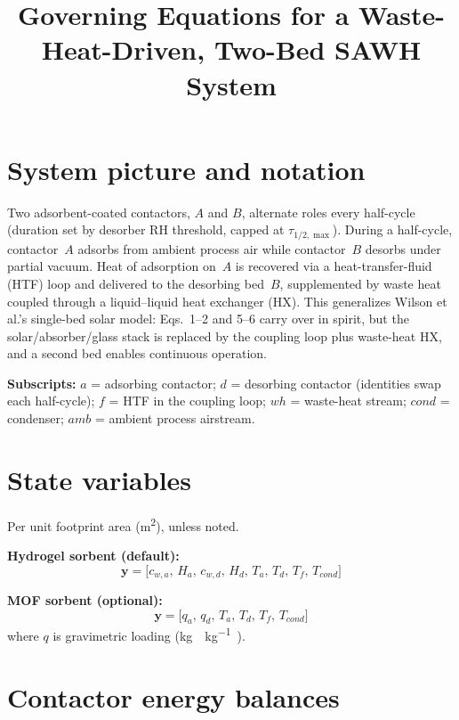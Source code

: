 \documentclass[11pt]{article}
\title{Governing Equations for a Waste-Heat-Driven, Two-Bed SAWH System}
\author{}
\date{}
\begin{document}
\maketitle

\section*{System picture and notation}

Two adsorbent-coated contactors, $A$ and $B$, alternate roles every half-cycle (duration set by desorber RH threshold, capped at $\tau_{1/2,\max}$). During a half-cycle, contactor~$A$ adsorbs from ambient process air while contactor~$B$ desorbs under partial vacuum. Heat of adsorption on~$A$ is recovered via a heat-transfer-fluid (HTF) loop and delivered to the desorbing bed~$B$, supplemented by waste heat coupled through a liquid--liquid heat exchanger (HX). This generalizes Wilson et al.'s single-bed solar model: Eqs.~1--2 and 5--6 carry over in spirit, but the solar/absorber/glass stack is replaced by the coupling loop plus waste-heat HX, and a second bed enables continuous operation.

\textbf{Subscripts:} $a$ = adsorbing contactor; $d$ = desorbing contactor (identities swap each half-cycle); $f$ = HTF in the coupling loop; $wh$ = waste-heat stream; $cond$ = condenser; $amb$ = ambient process airstream.

\section{State variables}

Per unit footprint area (\si{\metre\squared}), unless noted.

\textbf{Hydrogel sorbent (default):}
\begin{equation}
\mathbf{y} = \bigl[c_{w,a},\, H_a,\, c_{w,d},\, H_d,\, T_a,\, T_d,\, T_f,\, T_{cond}\bigr]
\end{equation}

\textbf{MOF sorbent (optional):}
\begin{equation}
\mathbf{y} = \bigl[q_a,\, q_d,\, T_a,\, T_d,\, T_f,\, T_{cond}\bigr]
\end{equation}
where $q$ is gravimetric loading (\si{\kilogram\water\per\kilogram\adsorbent}).

\section{Contactor energy balances}
\end{document}
